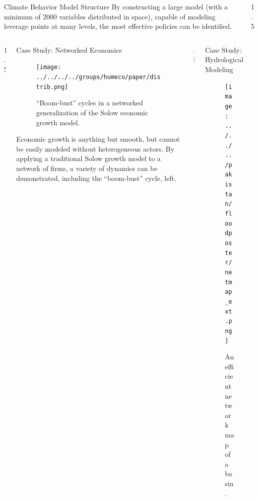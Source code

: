 \documentclass[final]{beamer}
\newlength{\sepwid}
\newlength{\onecolwid}
\newlength{\twocolwid}
\begin{document}
\begin{frame}[fragile]
\begin{columns}[t]
\begin{column}{\twocolwid}
\begin{block}{Climate Behavior Model Structure}
        \vspace{.5cm}
        By constructing a large model (with a minimum of 2000
        variables distributed in space), capable of modeling leverage
        points at many levels, the most effective policies can be
        identified.
    \end{block}

    \end{column}

    \begin{column}{1.5\sepwid}\end{column}			%

  \end{columns}



  \begin{columns}[t]
    
    \begin{column}{1.5\sepwid}\end{column}			%

    \begin{column}{\onecolwid}

      \begin{block}{Case Study: Networked Economics}
        \begin{figure}
          \texttt{[image: ../../../../groups/humeco/paper/distrib.png]}
          \caption*{``Boom-bust'' cycles in a networked generalization
            of the Solow economic growth model.}
        \end{figure}

        Economic growth is anything but smooth, but cannot be easily
        modeled without heterogeneous actors.  By applying a
        traditional Solow growth model to a network of firms, a
        variety of dynamics can be demonstrated, including the
        ``boom-bust'' cycle, left.
     \end{block}

    \end{column}

    \begin{column}{.5\sepwid}\end{column}			%

    \begin{column}{\twocolwid}

      \begin{block}{Case Study: Hydrological Modeling}
        \begin{figure}
          \texttt{[image: ../../../pakistan/floodposter/netmap\_ext.png]}
          \caption*{An efficient network map of a basin.}
        \end{figure}


\end{block}
\end{column}
\end{columns}
\end{frame}
\end{document}
